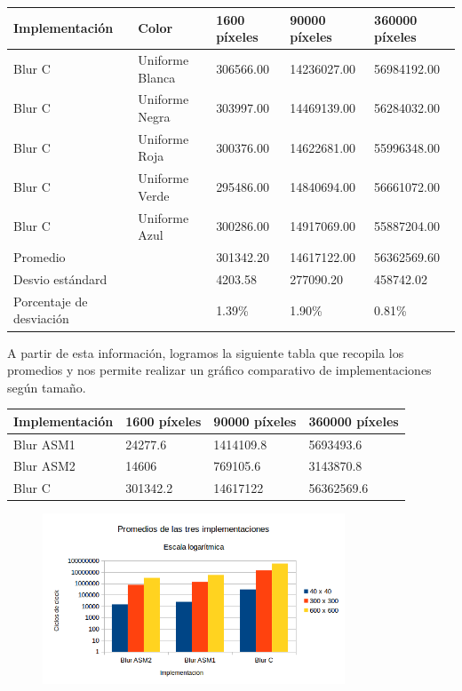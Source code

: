 \begin{tabular}{| l | l | l | l | l |}
\hline
Implementación & Color & 1600 píxeles & 90000 píxeles & 360000 píxeles\\
\hline
Blur C & Uniforme Blanca & 306566.00 & 14236027.00 & 56984192.00\\ 
\hline
Blur C & Uniforme Negra & 303997.00 & 14469139.00 & 56284032.00\\ 
\hline
Blur C & Uniforme Roja & 300376.00 & 14622681.00 & 55996348.00\\ 
\hline
Blur C & Uniforme Verde & 295486.00 & 14840694.00 & 56661072.00\\
\hline
Blur C & Uniforme Azul & 300286.00 & 14917069.00 & 55887204.00\\
\hline
Promedio & &   301342.20 & 14617122.00 & 56362569.60\\
\hline
Desvio estándard  &&  4203.58 & 277090.20 & 458742.02\\
\hline
Porcentaje de desviación  &&   1.39\% & 1.90\% & 0.81\%\\
\hline
\end{tabular}

A partir de esta información, logramos la siguiente tabla que recopila los promedios y nos permite realizar un gráfico comparativo de implementaciones según tamaño.\\



\begin{tabular}{| l | l | l | l|}
\hline
Implementación  & 1600 píxeles & 90000 píxeles & 360000 píxeles\\
\hline
Blur ASM1  & 24277.6 & 1414109.8 & 5693493.6\\
\hline
Blur ASM2  &  14606 & 769105.6 & 3143870.8\\
\hline
Blur C & 301342.2 & 14617122 & 56362569.6\\
\hline
\end{tabular}

\begin{figure}[ht]
\centering
\includegraphics[width=90mm]{blur/graficoBlur_cte.png}
\end{figure}

